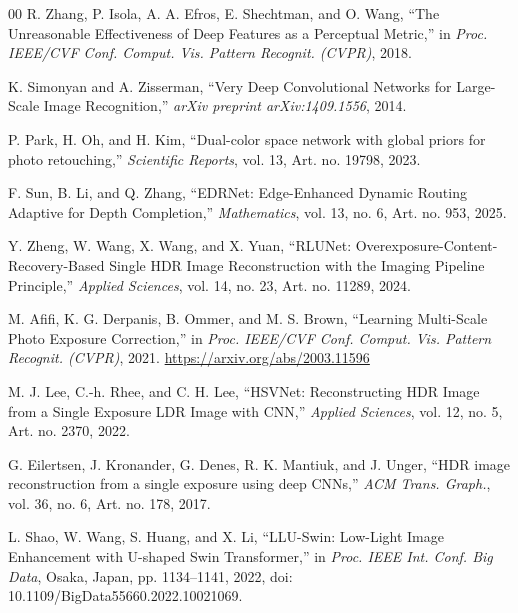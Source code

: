 \documentclass[conference]{IEEEtran}
\begin{document}
\begin{thebibliography}{00}
R. Zhang, P. Isola, A. A. Efros, E. Shechtman, and O. Wang, ``The Unreasonable Effectiveness of Deep Features as a Perceptual Metric,'' in \textit{Proc. IEEE/CVF Conf. Comput. Vis. Pattern Recognit. (CVPR)}, 2018.

K. Simonyan and A. Zisserman, ``Very Deep Convolutional Networks for Large-Scale Image Recognition,'' \textit{arXiv preprint arXiv:1409.1556}, 2014.

P. Park, H. Oh, and H. Kim, ``Dual-color space network with global priors for photo retouching,'' \textit{Scientific Reports}, vol. 13, Art. no. 19798, 2023.

F. Sun, B. Li, and Q. Zhang, ``EDRNet: Edge-Enhanced Dynamic Routing Adaptive for Depth Completion,'' \textit{Mathematics}, vol. 13, no. 6, Art. no. 953, 2025.

Y. Zheng, W. Wang, X. Wang, and X. Yuan, ``RLUNet: Overexposure-Content-Recovery-Based Single HDR Image Reconstruction with the Imaging Pipeline Principle,'' \textit{Applied Sciences}, vol. 14, no. 23, Art. no. 11289, 2024.

M. Afifi, K. G. Derpanis, B. Ommer, and M. S. Brown, ``Learning Multi-Scale Photo Exposure Correction,'' in \textit{Proc. IEEE/CVF Conf. Comput. Vis. Pattern Recognit. (CVPR)}, 2021. \url{https://arxiv.org/abs/2003.11596}

M. J. Lee, C.-h. Rhee, and C. H. Lee, ``HSVNet: Reconstructing HDR Image from a Single Exposure LDR Image with CNN,'' \textit{Applied Sciences}, vol. 12, no. 5, Art. no. 2370, 2022.

G. Eilertsen, J. Kronander, G. Denes, R. K. Mantiuk, and J. Unger, ``HDR image reconstruction from a single exposure using deep CNNs,'' \textit{ACM Trans. Graph.}, vol. 36, no. 6, Art. no. 178, 2017.

L. Shao, W. Wang, S. Huang, and X. Li, ``LLU-Swin: Low-Light Image Enhancement with U-shaped Swin Transformer,'' in \textit{Proc. IEEE Int. Conf. Big Data}, Osaka, Japan, pp. 1134--1141, 2022, doi: 10.1109/BigData55660.2022.10021069.

\end{thebibliography}
\end{document}
